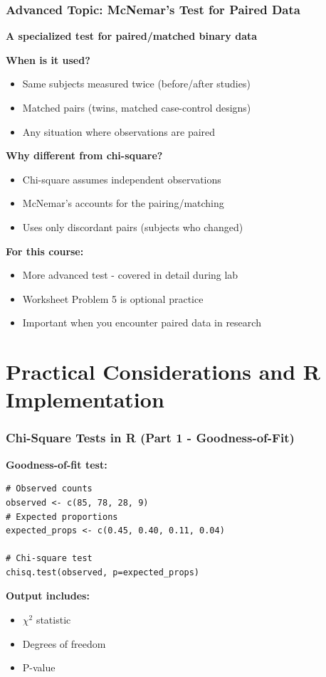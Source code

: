 \documentclass{beamer}
\begin{document}
\begin{frame}
\frametitle{Advanced Topic: McNemar's Test for Paired Data}
\textbf{A specialized test for paired/matched binary data}

\vspace{0.5cm}
\textbf{When is it used?}
\begin{itemize}
\item Same subjects measured twice (before/after studies)
\item Matched pairs (twins, matched case-control designs)
\item Any situation where observations are paired
\end{itemize}

\vspace{0.5cm}
\textbf{Why different from chi-square?}
\begin{itemize}
\item Chi-square assumes independent observations
\item McNemar's accounts for the pairing/matching
\item Uses only discordant pairs (subjects who changed)
\end{itemize}

\vspace{0.5cm}
\textbf{For this course:}
\begin{itemize}
\item More advanced test - covered in detail during lab
\item Worksheet Problem 5 is optional practice
\item Important when you encounter paired data in research
\end{itemize}
\end{frame}

\section{Practical Considerations and R Implementation}

\begin{frame}[fragile]
\frametitle{Chi-Square Tests in R (Part 1 - Goodness-of-Fit)}
\textbf{Goodness-of-fit test:}
\begin{verbatim}
# Observed counts
observed <- c(85, 78, 28, 9)
# Expected proportions
expected_props <- c(0.45, 0.40, 0.11, 0.04)

# Chi-square test
chisq.test(observed, p=expected_props)
\end{verbatim}

\vspace{0.5cm}
\textbf{Output includes:}
\begin{itemize}
\item $\chi^2$ statistic
\item Degrees of freedom
\item P-value
\end{itemize}
\end{frame}
\end{document}
